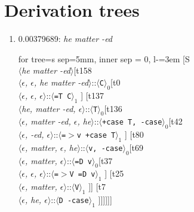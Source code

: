 \documentclass[11pt]{article}
\begin{document}
\section{Derivation trees}
\begin{enumerate}
	\item  0.00379689: \textit{he matter -ed} \\[0.5em]
	\begin{forest}
	for tree={s sep=5mm, inner sep = 0, l-=3em}
	[S\\$\langle$\textit{he matter -ed}$\rangle$[t158\\$\langle$\textit{$\epsilon${,} $\epsilon${,} he matter -ed}$\rangle$::$\langle$\texttt{C}$\rangle_0$[t0\\$\langle$\textit{$\epsilon${,} $\epsilon${,} $\epsilon$}$\rangle$::$\langle$\texttt{{=}T C}$\rangle_1$ ] [t137\\$\langle$\textit{he{,} matter -ed{,} $\epsilon$}$\rangle$::$\langle$\texttt{T}$\rangle_0$[t136\\$\langle$\textit{$\epsilon${,} matter -ed{,} $\epsilon${,} he}$\rangle$::$\langle$\texttt{+case T{,} -case}$\rangle_0$[t42\\$\langle$\textit{$\epsilon${,} -ed{,} $\epsilon$}$\rangle$::$\langle$\texttt{{=}$>$v +case T}$\rangle_1$ ] [t80\\$\langle$\textit{$\epsilon${,} matter{,} $\epsilon${,} he}$\rangle$::$\langle$\texttt{v{,} -case}$\rangle_0$[t69\\$\langle$\textit{$\epsilon${,} matter{,} $\epsilon$}$\rangle$::$\langle$\texttt{{=}D v}$\rangle_0$[t37\\$\langle$\textit{$\epsilon${,} $\epsilon${,} $\epsilon$}$\rangle$::$\langle$\texttt{{=}$>$V {=}D v}$\rangle_1$ ] [t25\\$\langle$\textit{$\epsilon${,} matter{,} $\epsilon$}$\rangle$::$\langle$\texttt{V}$\rangle_1$ ]] [t7\\$\langle$\textit{$\epsilon${,} he{,} $\epsilon$}$\rangle$::$\langle$\texttt{D -case}$\rangle_1$ ]]]]]]
	\end{forest}
	\newpage


\end{enumerate}
\end{document}
